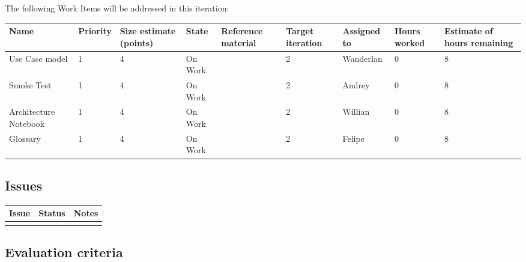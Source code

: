 The following Work Items will be addressed in this iteration:

\begin{adjustbox}{width=\textwidth}
\noindent\begin{tabular}{|l|l|l|l|l|l|l|l|l|}
\hline
Name & Priority & Size estimate (points) & State & Reference material & Target iteration & Assigned to & Hours worked & Estimate of hours remaining \\ \hline
Use Case model & 1 & 4 & On Work & & 2 & Wanderlan & 0 & 8 \\ \hline
Smoke Test & 1 & 4 & On Work & & 2 & Andrey & 0 & 8 \\ \hline
Architecture Notebook & 1 & 4 & On Work & & 2 & Willian & 0 & 8 \\ \hline
Glossary & 1 & 4 & On Work & & 2 & Felipe & 0 & 8 \\ \hline
\end{tabular}
\end{adjustbox}

\subsection*{Issues}



\noindent\begin{tabular}{|l|l|l|}
\hline
Issue & Status & Notes \\
\hline
 &  & \\
\hline
\end{tabular}

\subsection*{Evaluation criteria}



